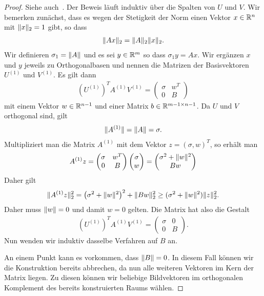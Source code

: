 \begin{proof}
  Siehe auch~\cite[Satz 4.11]{Rannacher17}.
  Der Beweis läuft induktiv über die Spalten von $U$ und $V$. Wir
  bemerken zunächst, dass es wegen der Stetigkeit der Norm einen
  Vektor $x\in \mathbb R^n$ mit $\lVert x\rVert_2 = 1$ gibt, so dass
  \begin{gather}
    \lVert Ax\rVert_2 = \lVert A\rVert_2\lVert x\rVert_2.
  \end{gather}
  Wir definieren $\sigma_1 = \lVert A\rVert$ und es sei $y\in \mathbb R^m$ so dass
  $\sigma_1y=Ax$. Wir ergänzen $x$ und $y$ jeweils zu Orthogonalbasen
  und nennen die Matrizen der Basisvektoren $U^{(1)}$ und
  $V^{(1)}$. Es gilt dann
  \begin{gather}
    \left(U^{(1)}\right)^T A^{(1)} V^{(1)} =
    \begin{pmatrix}
      \sigma& w^T\\0 & B
    \end{pmatrix}
  \end{gather}
  mit einem Vektor $w\in \mathbb R^{n-1}$ und einer Matrix
  $b\in \mathbb R^{m-1\times n-1}$. Da $U$ und $V$ orthogonal sind, gilt
  \begin{gather}
    \lVert A^{(1)}\rVert = \lVert A\rVert = \sigma.
  \end{gather}
  Multipliziert man die Matrix $A^{(1)}$ mit dem Vektor
  $ z=(\sigma,w)^T$, so erhält man
  \begin{gather}
    A^{(1)}z = 
    \begin{pmatrix}
    \sigma&w^T\\0&B
  \end{pmatrix}
  \begin{pmatrix}
    \sigma\\w
  \end{pmatrix}
  =
  \begin{pmatrix}
    \sigma^2+\lVert w\rVert^2\\
    Bw
  \end{pmatrix}
\end{gather}
Daher gilt
\begin{gather}
  \lVert A^{(1)}z\rVert_2^2 = \bigl(\sigma^2+\lVert w\rVert^2\bigr)^2 + \lVert Bw\rVert_2^2
  \ge (\sigma^2+\lVert w\rVert^2) \lVert z\rVert_2^2.
\end{gather}
Daher muss $\lVert w\rVert=0$ und damit $w=0$ gelten. Die Matrix hat also
die Gestalt
  \begin{gather}
    \left(U^{(1)}\right)^T A^{(1)} V^{(1)} =
    \begin{pmatrix}
      \sigma& 0\\0 & B
    \end{pmatrix}.
  \end{gather}
  Nun wenden wir induktiv dasselbe Verfahren auf $B$ an.

  An einem Punkt kann es vorkommen, dass $\lVert B\rVert=0$. In diesem Fall
  können wir die Konstruktion bereits abbrechen, da nun alle weiteren
  Vektoren im Kern der Matrix liegen. Zu diesen können wir beliebige
  Bildvektoren im orthogonalen Komplement des bereits konstruierten
  Raums wählen.
\end{proof}

